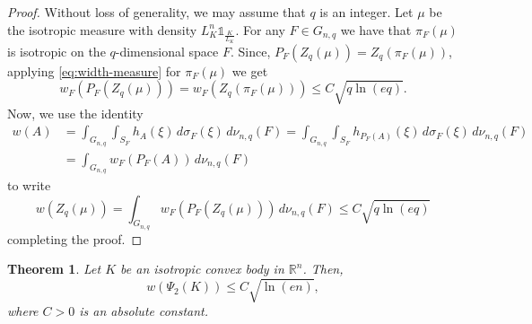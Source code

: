 \documentclass[11pt,leqno]{article}
\newtheorem{theorem}{Theorem}[section]
\theoremstyle{definition}
\numberwithin{equation}{section}
\newcommand{\ls}{\leqslant}
\begin{document}
\begin{proof}Without loss of generality, we may assume that $q$ is an integer. Let $\mu$ be the isotropic measure with density $L_K^n\mathds{1}_{\frac{K}{L_K}}$.
For any $F\in G_{n,q}$ we have that $\pi_F(\mu)$ is isotropic on the $q$-dimensional space $F$. Since, $P_F(Z_q(\mu))=Z_q(\pi_F(\mu))$, applying \eqref{eq:width-measure}
for $\pi_F(\mu)$ we get
$$w_F(P_F(Z_q(\mu)))=w_F(Z_q(\pi_F(\mu)))\ls C\sqrt{q\ln(eq)}.$$
Now, we use the identity
\begin{align*}w(A) &=\int_{G_{n,q}}\int_{S_F}h_A(\xi)\,d\sigma_F(\xi)\,d\nu_{n,q}(F)=\int_{G_{n,q}}\int_{S_F}h_{P_F(A)}(\xi)\,d\sigma_F(\xi)\,d\nu_{n,q}(F)\\
&=\int_{G_{n,q}}w_F(P_F(A))\,d\nu_{n,q}(F)\end{align*}
to write
$$w(Z_q(\mu))=\int_{G_{n,q}}w_F(P_F(Z_q(\mu)))\,d\nu_{n,q}(F)\ls C\sqrt{q\ln(eq)}$$
completing the proof.
\end{proof}



\begin{theorem}\label{th:1.3}Let $K$ be an isotropic convex body in ${\mathbb{R}}^n$. Then,
\[w(\Psi_2(K))\ls C\sqrt{\ln(en)},\]
where $C>0$ is an absolute constant.
\end{theorem}
\end{document}
